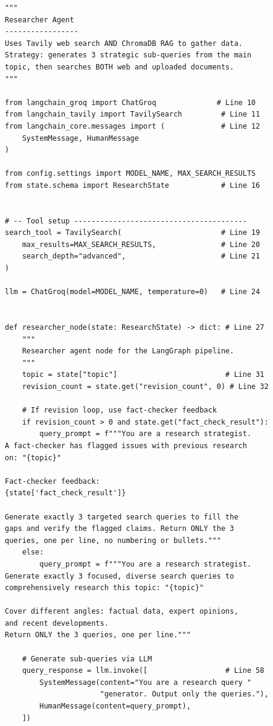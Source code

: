 \documentclass[12pt, a4paper]{article}
\begin{document}
\begin{lstlisting}[style=pythonstyle, title={\color{accentgreen}\faIcon{file} agents/researcher.py --- Full Code (121 lines)}]
"""
Researcher Agent
-----------------
Uses Tavily web search AND ChromaDB RAG to gather data.
Strategy: generates 3 strategic sub-queries from the main
topic, then searches BOTH web and uploaded documents.
"""

from langchain_groq import ChatGroq              # Line 10
from langchain_tavily import TavilySearch         # Line 11
from langchain_core.messages import (             # Line 12
    SystemMessage, HumanMessage
)

from config.settings import MODEL_NAME, MAX_SEARCH_RESULTS
from state.schema import ResearchState            # Line 16


# -- Tool setup ----------------------------------------
search_tool = TavilySearch(                       # Line 19
    max_results=MAX_SEARCH_RESULTS,               # Line 20
    search_depth="advanced",                      # Line 21
)

llm = ChatGroq(model=MODEL_NAME, temperature=0)   # Line 24


def researcher_node(state: ResearchState) -> dict: # Line 27
    """
    Researcher agent node for the LangGraph pipeline.
    """
    topic = state["topic"]                         # Line 31
    revision_count = state.get("revision_count", 0) # Line 32

    # If revision loop, use fact-checker feedback
    if revision_count > 0 and state.get("fact_check_result"):
        query_prompt = f"""You are a research strategist.
A fact-checker has flagged issues with previous research
on: "{topic}"

Fact-checker feedback:
{state['fact_check_result']}

Generate exactly 3 targeted search queries to fill the
gaps and verify the flagged claims. Return ONLY the 3
queries, one per line, no numbering or bullets."""
    else:
        query_prompt = f"""You are a research strategist.
Generate exactly 3 focused, diverse search queries to
comprehensively research this topic: "{topic}"

Cover different angles: factual data, expert opinions,
and recent developments.
Return ONLY the 3 queries, one per line."""

    # Generate sub-queries via LLM
    query_response = llm.invoke([                  # Line 58
        SystemMessage(content="You are a research query "
                      "generator. Output only the queries."),
        HumanMessage(content=query_prompt),
    ])


\end{lstlisting}
\end{document}
